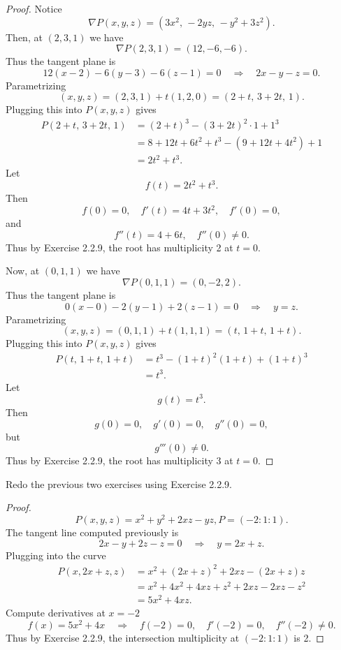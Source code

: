 \begin{proof}
    Notice
    \[
    \nabla P(x,y,z) = (3x^2,\, -2yz,\, -y^2 + 3z^2).
    \]
    Then, at $(2,3,1)$ we have
    \[
    \nabla P(2,3,1) = (12, -6, -6).
    \]
    Thus the tangent plane is
    \[
    12(x - 2) - 6(y - 3) - 6(z - 1) = 0 
    \quad \Longrightarrow \quad 2x - y - z = 0.
    \]
    Parametrizing 
    \[
    (x,y,z) = (2,3,1) + t(1,2,0) = (2+t,\, 3+2t,\, 1).
    \]
    Plugging this into $P(x,y,z)$ gives
    \[
    \begin{aligned}
    P(2+t,\, 3+2t,\, 1) 
    &= (2+t)^3 - (3+2t)^2 \cdot 1 + 1^3 \\
    &= 8 + 12t + 6t^2 + t^3 - (9 + 12t + 4t^2) + 1 \\
    &= 2t^2 + t^3.
    \end{aligned}
    \]
    Let
    \[
    f(t) = 2t^2 + t^3.
    \]
    Then
    \[
    f(0) = 0, \quad f'(t) = 4t + 3t^2, \quad f'(0) = 0,
    \]
    and
    \[
    f''(t) = 4 + 6t, \quad f''(0) \neq 0.
    \]
    Thus by Exercise 2.2.9, the root has multiplicity 2 at $t=0$.

    Now, at $(0,1,1)$ we have
    \[
    \nabla P(0,1,1) = (0, -2, 2).
    \]
    Thus the tangent plane is
    \[
    0(x - 0) -2(y - 1) + 2(z - 1) = 0 
    \quad \Longrightarrow \quad y = z.
    \]
    Parametrizing 
    \[
    (x,y,z) = (0,1,1) + t(1,1,1) = (t,\, 1+t,\, 1+t).
    \]
    Plugging this into $P(x,y,z)$ gives
    \[
    \begin{aligned}
    P(t,\, 1+t,\, 1+t) 
    &= t^3 - (1+t)^2(1+t) + (1+t)^3 \\
    &= t^3.
    \end{aligned}
    \]
    Let
    \[
    g(t) = t^3.
    \]
    Then
    \[
    g(0) = 0, \quad g'(0) = 0, \quad g''(0) = 0,
    \]
    but
    \[
    g'''(0) \neq 0.
    \]
    Thus by Exercise 2.2.9, the root has multiplicity 3 at $t=0$.
\end{proof}

\begin{tcolorbox}[title=Problem 17, breakable]
    Redo the previous two exercises using Exercise 2.2.9.
\end{tcolorbox}

\begin{proof}
    \[P(x,y,z) = x^2 + y^2 + 2xz - yz, P = (-2:1:1).\]
    The tangent line computed previously is
    \[
    2x - y + 2z - z = 0 \quad \Longrightarrow \quad y = 2x + z.
    \]
    Plugging into the curve
    \[
    \begin{aligned}
    P(x,2x+z,z) &= x^2 + (2x+z)^2 + 2 x z - (2x+z) z \\
    &= x^2 + 4x^2 + 4xz + z^2 + 2xz - 2xz - z^2 \\
    &= 5x^2 + 4xz.
    \end{aligned}
    \]
    Compute derivatives at $x=-2$ 
    \[
    f(x) = 5x^2 + 4x \quad \Rightarrow \quad f(-2) = 0, \quad f'(-2) = 0, \quad f''(-2) \neq 0.
    \]
    Thus by Exercise 2.2.9, the intersection multiplicity at $(-2:1:1)$ is 2.
\end{proof}

